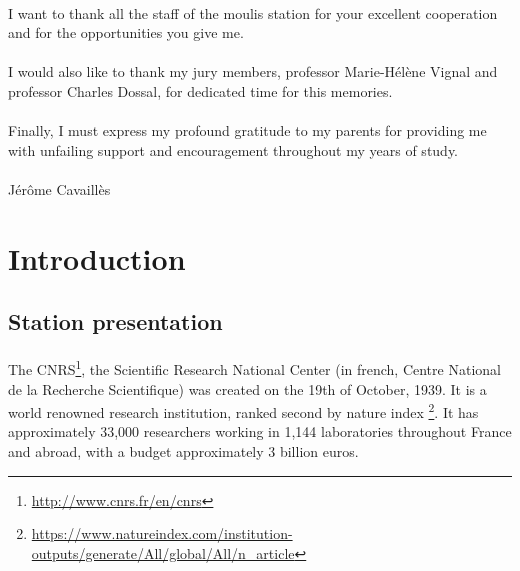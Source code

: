 \documentclass{article}
\begin{document}
\paragraph{}
I want to thank all the staff of the moulis station for your excellent cooperation and for the opportunities you give me.

\paragraph{}
I would also like to thank my jury members, professor  Marie-Hélène Vignal and professor Charles Dossal, for dedicated time for this memories.

\paragraph{}
Finally, I must express my profound gratitude to my parents for providing me with unfailing support and encouragement throughout my years of study. 

\paragraph{}
Jérôme Cavaillès



\newpage
\section*{Introduction}

\subsection*{Station presentation}

\paragraph{}
The CNRS\footnote{\url{http://www.cnrs.fr/en/cnrs}}, the Scientific Research National Center (in french, Centre National de la Recherche Scientifique) was created on the 19th of October, 1939. It is a world renowned research institution, ranked second by nature index \footnote{\url{https://www.natureindex.com/institution-outputs/generate/All/global/All/n_article}}. It has approximately 33,000 researchers working in 1,144 laboratories throughout France and abroad, with a budget approximately 3 billion euros. 
\end{document}
